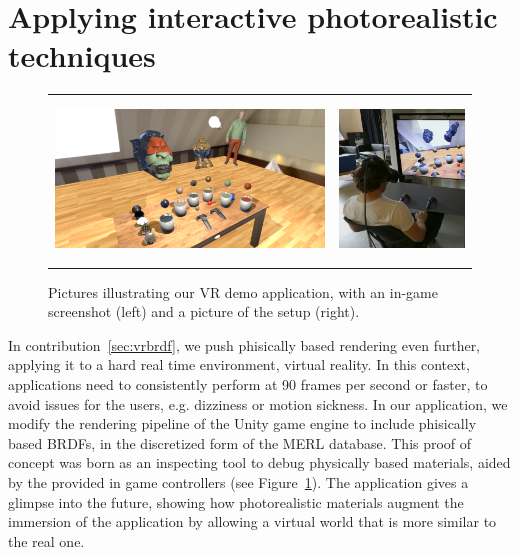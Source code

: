 \section{Applying interactive photorealistic techniques}
\begin{figure}[t]
\centering
\begin{tabular}{@{}c@{}c@{}}
	 \includegraphics[height = 4.3cm]{figures/screen1_crop} &
		 \includegraphics[height = 4.3cm]{figures/person} \\[-2.5ex]
\end{tabular}
  \caption{Pictures illustrating our VR demo application, with an in-game screenshot (left) and a picture of the setup (right). }
  \label{fig:vrbrdfimage}
\end{figure}
In contribution~\ref{sec:vrbrdf}, we push phisically based rendering even further, applying it to a hard real time environment, virtual reality. In this context, applications need to consistently perform at 90 frames per second or faster, to avoid issues for the users, e.g. dizziness or motion sickness. In our application, we modify the rendering pipeline of the Unity game engine  to include phisically based BRDFs, in the discretized form of the MERL database. This proof of concept was born as an inspecting tool to debug physically based materials, aided by the provided in game controllers (see Figure~\ref{fig:vrbrdfimage}). The application gives a glimpse into the future, showing how photorealistic materials augment the immersion of the application by allowing a virtual world that is more similar to the real one. 


